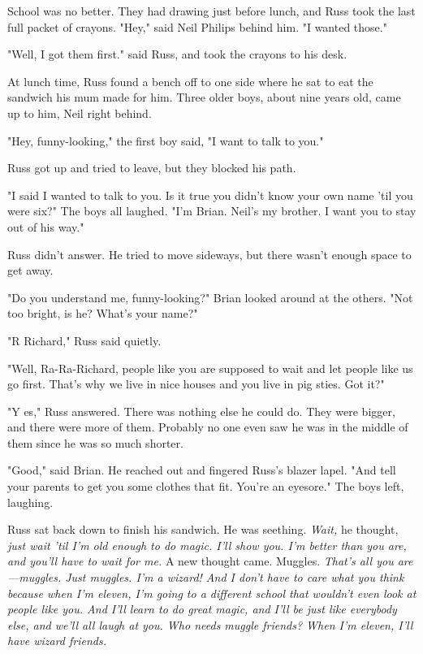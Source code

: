 School was no better. They had drawing just before lunch, and Russ took the last full packet of crayons. "Hey," said Neil Philips behind him. "I wanted those."

"Well, I{\el} got them{\el} first." said Russ, and took the crayons to his desk.

At lunch time, Russ found a bench off to one side where he sat to eat the sandwich his mum made for him. Three older boys, about nine years old, came up to him, Neil right behind.

"Hey, funny-looking," the first boy said, "I want to talk to you."

Russ got up and tried to leave, but they blocked his path.

"I said I wanted to talk to you. Is it true you didn't know your own name 'til you were six?" The boys all laughed. "I'm Brian. Neil's my brother. I want you to stay out of his way."

Russ didn't answer. He tried to move sideways, but there wasn't enough space to get away.

"Do you understand me, funny-looking?" Brian looked around at the others. "Not too bright, is he? What's your name?"

"R{\el} Richard," Russ said quietly.

"Well, Ra-Ra-Richard, people like you are supposed to wait and let people like us go first. That's why we live in nice houses and you live in pig sties. Got it?"

"Y{\el} es," Russ answered. There was nothing else he could do. They were bigger, and there were more of them. Probably no one even saw he was in the middle of them since he was so much shorter.

"Good," said Brian. He reached out and fingered Russ's blazer lapel. "And tell your parents to get you some clothes that fit. You're an eyesore." The boys left, laughing.

Russ sat back down to finish his sandwich. He was seething. \emph{Wait,} he thought, \emph{just wait 'til I'm old enough to do magic. I'll show you. I'm better than you are, and you'll have to wait for me.} A new thought came. Muggles. \emph{That's all you are—muggles. Just muggles. I'm a wizard! And I don't have to care what you think because when I'm eleven, I'm going to a different school that wouldn't even look at people like you. And I'll learn to do great magic, and I'll be just like everybody else, and we'll all laugh at you. Who needs muggle friends? When I'm eleven, I'll have wizard friends.}

